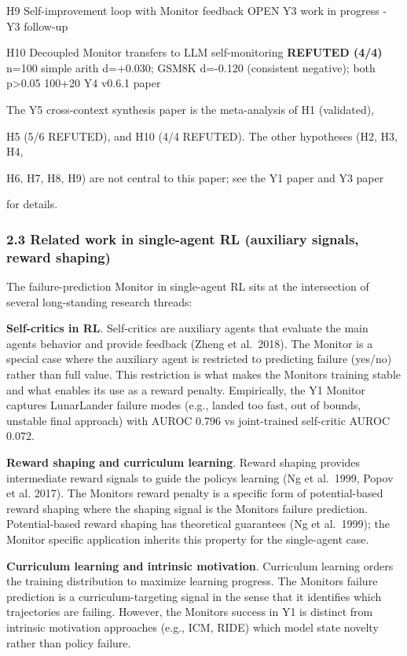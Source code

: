 \documentclass[11pt]{article}
\begin{document}
H9 \textbar{} Self-improvement loop with Monitor feedback \textbar{}
OPEN \textbar{} Y3 work in progress \textbar{} - \textbar{} Y3 follow-up
\textbar{}

H10 \textbar{} Decoupled Monitor transfers to LLM self-monitoring
\textbar{} \textbf{REFUTED (4/4)} \textbar{} n=100 simple arith
d=+0.030; GSM8K d=-0.120 (consistent negative); both p\textgreater0.05
\textbar{} 100+20 \textbar{} Y4 v0.6.1 paper \textbar{}

The Y5 cross-context synthesis paper is the meta-analysis of H1
(validated),

H5 (5/6 REFUTED), and H10 (4/4 REFUTED). The other hypotheses (H2, H3,
H4,

H6, H7, H8, H9) are not central to this paper; see the Y1 paper and Y3
paper

for details.

\subsubsection{2.3 Related work in single-agent RL (auxiliary signals,
reward
shaping)}\label{related-work-in-single-agent-rl-auxiliary-signals-reward-shaping}

The failure-prediction Monitor in single-agent RL sits at the
intersection of several long-standing research threads:

\textbf{Self-critics in RL}. Self-critics are auxiliary agents that
evaluate the main agents behavior and provide feedback (Zheng et
al.~2018). The Monitor is a special case where the auxiliary agent is
restricted to predicting failure (yes/no) rather than full value. This
restriction is what makes the Monitors training stable and what enables
its use as a reward penalty. Empirically, the Y1 Monitor captures
LunarLander failure modes (e.g., landed too fast, out of bounds,
unstable final approach) with AUROC 0.796 vs joint-trained self-critic
AUROC 0.072.

\textbf{Reward shaping and curriculum learning}. Reward shaping provides
intermediate reward signals to guide the policys learning (Ng et
al.~1999, Popov et al. 2017). The Monitors reward penalty is a specific
form of potential-based reward shaping where the shaping signal is the
Monitors failure prediction. Potential-based reward shaping has
theoretical guarantees (Ng et al.~1999); the Monitor specific
application inherits this property for the single-agent case.

\textbf{Curriculum learning and intrinsic motivation}. Curriculum
learning orders the training distribution to maximize learning progress.
The Monitors failure prediction is a curriculum-targeting signal in the
sense that it identifies which trajectories are failing. However, the
Monitors success in Y1 is distinct from intrinsic motivation approaches
(e.g., ICM, RIDE) which model state novelty rather than policy failure.
\end{document}
